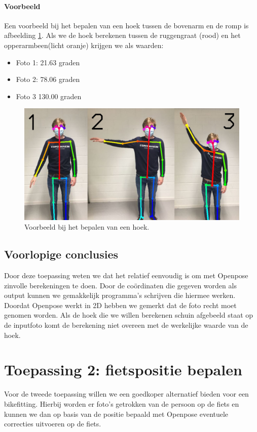 \documentclass[a4paper,twoside,kulak]{kulakreport}
\begin{document}
\paragraph{Voorbeeld}
Een voorbeeld bij het bepalen van een hoek tussen de bovenarm en de romp is afbeelding \ref{samen}. Als we de hoek berekenen tussen de ruggengraat (rood) en het opperarmbeen(licht oranje) krijgen we als waarden:
\begin{itemize}
	\item Foto 1: 21.63 graden
	\item Foto 2: 78.06 graden
	\item Foto 3 130.00 graden
\end{itemize}
\begin{figure}
	\begin{center}
		\includegraphics[width=12cm]{samen.jpg}
	\end{center}
	\caption{Voorbeeld bij het bepalen van een hoek.}
	\label{samen}
\end{figure}
\subsection{Voorlopige conclusies}
Door deze  toepassing weten we dat het relatief eenvoudig is om met Openpose zinvolle berekeningen te doen. Door de coördinaten die gegeven worden als output kunnen we gemakkelijk programma's schrijven die hiermee werken. Doordat Openpose werkt in 2D hebben we gemerkt dat de foto recht moet genomen worden. Als de hoek die we willen berekenen schuin afgebeeld staat op de inputfoto komt de berekening niet overeen met de werkelijke waarde van de hoek.


\section{Toepassing 2: fietspositie bepalen}
Voor de tweede toepassing willen we een goedkoper alternatief bieden voor een bikefitting. Hierbij worden er foto's getrokken van de persoon op de fiets en kunnen we dan op basis van de positie bepaald met Openpose eventuele correcties uitvoeren op de fiets.
\end{document}

